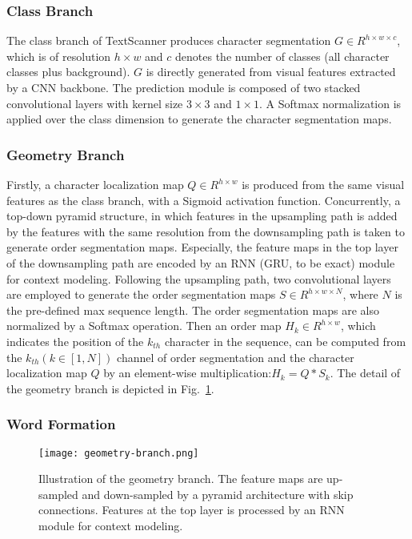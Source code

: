 \documentclass[letterpaper]{article} \usepackage{aaai20}  \usepackage{times}  \usepackage{helvet} \usepackage{courier}  \usepackage[hyphens]{url}  \usepackage{graphicx} \urlstyle{rm} \def\UrlFont{\rm}  \usepackage{graphicx}  \frenchspacing  \setlength{\pdfpagewidth}{8.5in}  \setlength{\pdfpageheight}{11in}
\begin{document}
\subsubsection{Class Branch}
The class branch of TextScanner produces character segmentation $G \in R^{h \times w \times c}$, which is of resolution $h \times w$ and $c$ denotes the number of classes (all character classes plus background). $G$ is directly generated from visual features extracted by a CNN backbone. The prediction module is composed of two stacked convolutional layers with kernel size $3 \times 3$ and $1 \times 1$. A Softmax normalization is applied over the class dimension to generate the character segmentation maps.


\subsubsection{Geometry Branch} 

Firstly, a character localization map $Q \in R^{h \times w}$ is produced from the same visual features as the class branch, with a Sigmoid activation function. Concurrently, a top-down pyramid structure, in which features in the upsampling path is added by the features with the same resolution from the downsampling path is taken to generate order segmentation maps. Especially, the feature maps in the top layer of the downsampling path are encoded by an RNN (GRU\cite{GRU}, to be exact) module for context modeling. Following the upsampling path, two convolutional layers are employed to generate the order segmentation maps $S \in R^{h \times w \times N}$, where $N$ is the pre-defined max sequence length. The order segmentation maps are also normalized by a Softmax operation. Then an order map $H_{k} \in R^{h \times w}$, which indicates the position of the $k_{th}$ character in the sequence, can be computed from the $k_{th} (k \in [1, N])$ channel of order segmentation and the character localization map $Q$ by an element-wise multiplication:$H_{k} =Q * S_{k}$.
The detail of the geometry branch is depicted in Fig.~\ref{fig:order}.

\subsubsection{Word Formation}

\begin{figure}[t]
\centering
\texttt{[image: geometry-branch.png]}
\caption
{Illustration of the geometry branch. The feature maps are up-sampled and down-sampled by a pyramid architecture with skip connections. Features at the top layer is processed by an RNN module for context modeling.}
\label{fig:order}
\end{figure}
\end{document}
